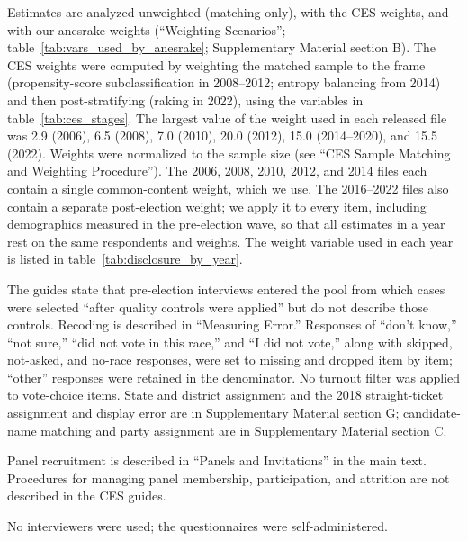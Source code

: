 \documentclass[12pt]{article}
\begin{document}
\begin{description}[style=unboxed, leftmargin=0pt, font=\normalfont\bfseries]
\item[Whether and How the Data Were Weighted:] Estimates are analyzed unweighted (matching only), with the CES weights, and with our anesrake weights (``Weighting Scenarios''; table~\ref{tab:vars_used_by_anesrake}; Supplementary Material section B). The CES weights were computed by weighting the matched sample to the frame (propensity-score subclassification in 2008--2012; entropy balancing from 2014) and then post-stratifying (raking in 2022), using the variables in table~\ref{tab:ces_stages}. The largest value of the weight used in each released file was 2.9 (2006), 6.5 (2008), 7.0 (2010), 20.0 (2012), 15.0 (2014--2020), and 15.5 (2022). Weights were normalized to the sample size (see ``CES Sample Matching and Weighting Procedure''). The 2006, 2008, 2010, 2012, and 2014 files each contain a single common-content weight, which we use. The 2016--2022 files also contain a separate post-election weight; we apply it to every item, including demographics measured in the pre-election wave, so that all estimates in a year rest on the same respondents and weights. The weight variable used in each year is listed in table~\ref{tab:disclosure_by_year}.

\item[How the Data Were Processed and Procedures to Ensure Data Quality:] The guides state that pre-election interviews entered the pool from which cases were selected ``after quality controls were applied'' but do not describe those controls. Recoding is described in ``Measuring Error.'' Responses of ``don't know,'' ``not sure,'' ``did not vote in this race,'' and ``I did not vote,'' along with skipped, not-asked, and no-race responses, were set to missing and dropped item by item; ``other'' responses were retained in the denominator. No turnout filter was applied to vote-choice items. State and district assignment and the 2018 straight-ticket assignment and display error are in Supplementary Material section G; candidate-name matching and party assignment are in Supplementary Material section C.

\item[Panel Description:] Panel recruitment is described in ``Panels and Invitations'' in the main text. Procedures for managing panel membership, participation, and attrition are not described in the CES guides.

\item[Interviewer Details:] No interviewers were used; the questionnaires were self-administered.


\end{description}
\end{document}
